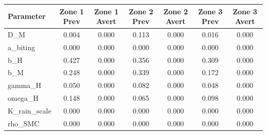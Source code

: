\begin{tabular}{lcccccc}
\hline
Parameter & Zone 1 Prev & Zone 1 Avert & Zone 2 Prev & Zone 2 Avert & Zone 3 Prev & Zone 3 Avert \\
\hline
D_M & 0.004 & 0.000 & 0.113 & 0.000 & 0.016 & 0.000 \\
a_biting & 0.000 & 0.000 & 0.000 & 0.000 & 0.000 & 0.000 \\
b_H & 0.427 & 0.000 & 0.356 & 0.000 & 0.309 & 0.000 \\
b_M & 0.248 & 0.000 & 0.339 & 0.000 & 0.172 & 0.000 \\
gamma_H & 0.050 & 0.000 & 0.082 & 0.000 & 0.048 & 0.000 \\
omega_H & 0.148 & 0.000 & 0.065 & 0.000 & 0.098 & 0.000 \\
K_rain_scale & 0.000 & 0.000 & 0.000 & 0.000 & 0.000 & 0.000 \\
rho_SMC & 0.000 & 0.000 & 0.000 & 0.000 & 0.000 & 0.000 \\
\hline
\end{tabular}
